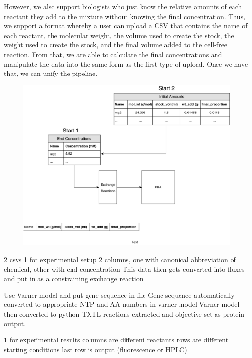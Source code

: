 However, we also support biologists who just know the relative amounts of each reactant they add to the mixture without knowing the final concentration.
Thus, we support a format whereby a user can upload a CSV that contains the name of each reactant, the molecular weight, the volume used to create the stock, the weight used to create the stock, and the final volume added to the cell-free reaction.
From that, we are able to calculate the final concentrations and manipulate the data into the same form as the first type of upload.
Once we have that, we can unify the pipeline.

\begin{figure}[t!]
\begin{center}
\includegraphics{figs/DataIngestion.pdf}
\caption{}
\end{center}
\label{fig:ingest}
\end{figure}


2 csvs
1 for experimental setup
2 columns, one with canonical abbreviation of chemical, other with end concentration
This data then gets converted into fluxes and put in as a constraining exchange reaction

Use Varner model and put gene sequence in file
Gene sequence automatically converted to appropriate NTP and AA numbers in varner model
Varner model then converted to python
TXTL reactions extracted and objective set as protein output.

1 for experimental results
columns are different reactants
rows are different starting conditions
last row is output (fluorescence or HPLC)

